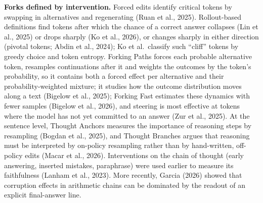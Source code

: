 \documentclass[
  10pt,
  a4paper,
]{article}
\begin{document}
\textbf{Forks defined by intervention.} Forced edits identify critical tokens by swapping in alternatives and regenerating (Ruan et al., 2025). Rollout-based definitions find tokens after which the
chance of a correct answer collapses (Lin et al., 2025) or drops sharply (Ko et al., 2026), or changes sharply in either direction (pivotal tokens; Abdin et al., 2024); Ko et al.~classify such
``cliff'' tokens by greedy choice and token entropy. Forking Paths forces each probable alternative token, resamples continuations after it and weights the outcomes by the token's probability, so it
contains both a forced effect per alternative and their probability-weighted mixture; it studies how the outcome distribution moves along a text (Bigelow et al., 2025); Forking Fast estimates these
dynamics with fewer samples (Bigelow et al., 2026), and steering is most effective at tokens where the model has not yet committed to an answer (Zur et al., 2025). At the sentence level, Thought
Anchors measures the importance of reasoning steps by resampling (Bogdan et al., 2025), and Thought Branches argues that reasoning must be interpreted by on-policy resampling rather than by
hand-written, off-policy edits (Macar et al., 2026). Interventions on the chain of thought (early answering, inserted mistakes, paraphrase) were used earlier to measure its faithfulness (Lanham et
al., 2023). More recently, Garcia (2026) showed that corruption effects in arithmetic chains can be dominated by the readout of an explicit final-answer line.
\end{document}
